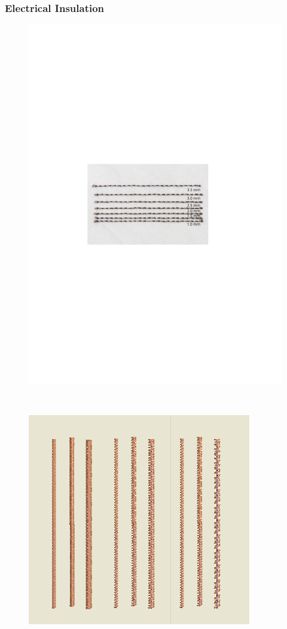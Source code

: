 \subsubsection{Electrical Insulation}
\begin{figure}
\centering
  \includegraphics[width=0.9\columnwidth]{figures/Spacing}
  \caption{}~\label{fig:Spacing}
  \vspace{-2.5em}
\end{figure}
\begin{figure}
\centering
  \includegraphics[width=0.9\columnwidth]{figures/Insulation}
  \caption{}~\label{fig:Insulation}
  \vspace{-2.5em}
\end{figure}
